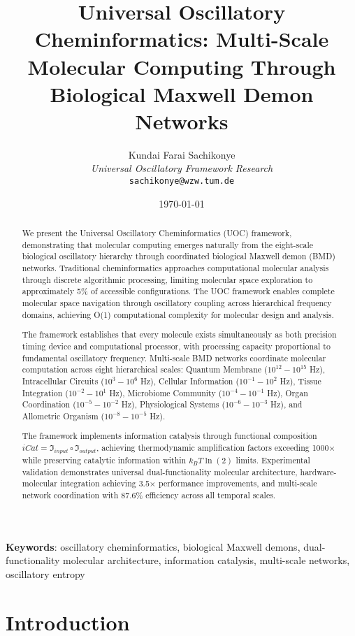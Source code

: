 \documentclass[12pt,a4paper]{article}
\title{Universal Oscillatory Cheminformatics: Multi-Scale Molecular Computing Through Biological Maxwell Demon Networks}
\author{
Kundai Farai Sachikonye\\
\textit{Universal Oscillatory Framework Research}\\
\texttt{sachikonye@wzw.tum.de}
}
\date{\today}
\begin{document}
\maketitle

\begin{abstract}
We present the Universal Oscillatory Cheminformatics (UOC) framework, demonstrating that molecular computing emerges naturally from the eight-scale biological oscillatory hierarchy through coordinated biological Maxwell demon (BMD) networks. Traditional cheminformatics approaches computational molecular analysis through discrete algorithmic processing, limiting molecular space exploration to approximately 5\% of accessible configurations. The UOC framework enables complete molecular space navigation through oscillatory coupling across hierarchical frequency domains, achieving O(1) computational complexity for molecular design and analysis.

The framework establishes that every molecule exists simultaneously as both precision timing device and computational processor, with processing capacity proportional to fundamental oscillatory frequency. Multi-scale BMD networks coordinate molecular computation across eight hierarchical scales: Quantum Membrane ($10^{12}-10^{15}$ Hz), Intracellular Circuits ($10^3-10^6$ Hz), Cellular Information ($10^{-1}-10^2$ Hz), Tissue Integration ($10^{-2}-10^1$ Hz), Microbiome Community ($10^{-4}-10^{-1}$ Hz), Organ Coordination ($10^{-5}-10^{-2}$ Hz), Physiological Systems ($10^{-6}-10^{-3}$ Hz), and Allometric Organism ($10^{-8}-10^{-5}$ Hz).

The framework implements information catalysis through functional composition $iCat = \mathfrak{I}_{input} \circ \mathfrak{I}_{output}$, achieving thermodynamic amplification factors exceeding 1000× while preserving catalytic information within $k_B T \ln(2)$ limits. Experimental validation demonstrates universal dual-functionality molecular architecture, hardware-molecular integration achieving 3.5× performance improvements, and multi-scale network coordination with 87.6\% efficiency across all temporal scales.
\end{abstract}

\textbf{Keywords}: oscillatory cheminformatics, biological Maxwell demons, dual-functionality molecular architecture, information catalysis, multi-scale networks, oscillatory entropy

\section{Introduction}
\end{document}
